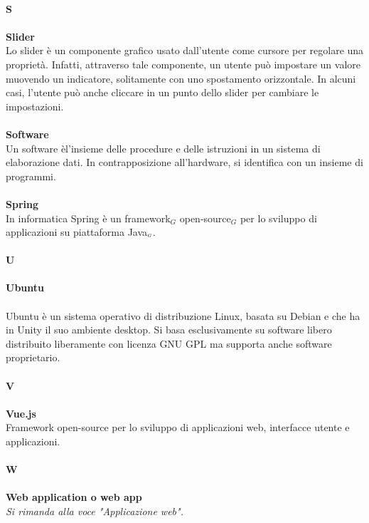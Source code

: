 \\
\textbf{S} \\
\\
\textbf{Slider} \\
Lo slider è un componente grafico usato dall'utente come cursore per regolare una proprietà. Infatti, attraverso tale componente, un utente può impostare un valore muovendo un indicatore, solitamente con uno spostamento orizzontale. In alcuni casi, l'utente può anche cliccare in un punto dello slider per cambiare le impostazioni.  \\
\\
\textbf{Software} \\
Un software èl'insieme delle procedure e delle istruzioni in un sistema di elaborazione dati. In contrapposizione all'hardware, si identifica con un insieme di programmi. \\
\\
\textbf{Spring} \\
In informatica Spring è un framework$_G$ open-source$_G$ per lo sviluppo di applicazioni su piattaforma Java$_{\scaleto{G}{3pt}}$.\\
\\
\textbf{U} \\
\\
\textbf{Ubuntu} \\
\\
Ubuntu è un sistema operativo di distribuzione Linux, basata su Debian e che ha in Unity il suo ambiente desktop. Si basa esclusivamente su software libero distribuito liberamente con licenza GNU GPL ma supporta anche software proprietario. \\
\\
\textbf{V}\\
\\
\textbf{Vue.js}\\
 Framework open-source per lo sviluppo di applicazioni web, interfacce utente e applicazioni. \\
\\
\textbf{W} \\
\\
\textbf{Web application o web app}\\
\textit{Si rimanda alla voce "Applicazione web".}